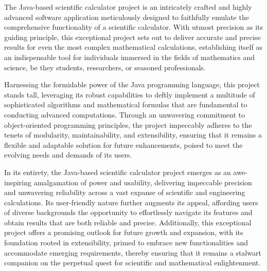 \documentclass[letterpaper, 11pt]{report}
\begin{document}
\normalsize{The Java-based scientific calculator project is an intricately crafted and highly advanced software application meticulously designed to faithfully emulate the comprehensive functionality of a scientific calculator. With utmost precision as its guiding principle, this exceptional project sets out to deliver accurate and precise results for even the most complex mathematical calculations, establishing itself as an indispensable tool for individuals immersed in the fields of mathematics and science, be they students, researchers, or seasoned professionals.

Harnessing the formidable power of the Java programming language, this project stands tall, leveraging its robust capabilities to deftly implement a multitude of sophisticated algorithms and mathematical formulas that are fundamental to conducting advanced computations. Through an unwavering commitment to object-oriented programming principles, the project impeccably adheres to the tenets of modularity, maintainability, and extensibility, ensuring that it remains a flexible and adaptable solution for future enhancements, poised to meet the evolving needs and demands of its users.

In its entirety, the Java-based scientific calculator project emerges as an awe-inspiring amalgamation of power and usability, delivering impeccable precision and unwavering reliability across a vast expanse of scientific and engineering calculations. Its user-friendly nature further augments its appeal, affording users of diverse backgrounds the opportunity to effortlessly navigate its features and obtain results that are both reliable and precise. Additionally, this exceptional project offers a promising outlook for future growth and expansion, with its foundation rooted in extensibility, primed to embrace new functionalities and accommodate emerging requirements, thereby ensuring that it remains a stalwart companion on the perpetual quest for scientific and mathematical enlightenment.}
\\
\pagebreak
{}
\end{document}
